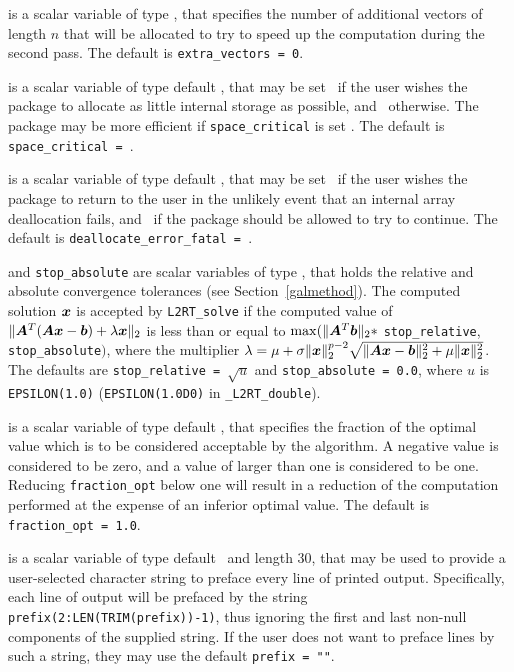 \documentclass{galahad}
\newcommand{\packagename}{L2\-RT}
\newcommand{\fullpackagename}{\libraryname\_\packagename}
\begin{document}
\begin{description}
 is a scalar variable of type \integer,
that specifies the number of additional vectors of length $n$
that will be allocated to try to speed up the computation during the
second pass.
The default is {\tt extra\_vectors = 0}.

 is a scalar variable of type default \logical, that
may be set \true\ if the user wishes the package to allocate as little
internal storage as possible, and \false\ otherwise. The package may
be more efficient if {\tt space\_critical} is set \false.
The default is {\tt space\_critical = \false}.

 is a scalar variable of type default \logical,
that may be set \true\ if the user wishes the package to return to the user
in the unlikely event that an internal array deallocation fails,
and \false\ if the package should be allowed to try to continue.
The default is {\tt deallocate\_error\_fatal = \false}.

 and {\tt stop\_absolute} are scalar variables of type
\realdp, that holds the
relative and absolute convergence tolerances (see Section~\ref{galmethod}).
The computed solution ${\bm{x}}$ is accepted by {\tt \packagename\_solve}
if the computed value of
$\|{\bm{A}}^T ( {\bm{A}} {\bm{x}} - {\bm{b}} ) + \lambda {\bm{x}}\|_2$
is less than or equal
to $\max (\| {\bm{A}}^T {\bm{b}} \|_2 \ast$ {\tt stop\_relative},
{\tt stop\_absolute}$)$, where the multiplier
$\lambda = \mu + \sigma \|{\bm{x}}\|_2^{p-2}
 \sqrt{\| {\bm{A}} {\bm{x}} - {\bm{b}} \|_2^2 + \mu \|{\bm{x}}\|_2^2}$.
The defaults are {\tt stop\_\-relative = $\sqrt{u}$} and
{\tt stop\_absolute = 0.0},
where $u$ is {\tt EPSILON(1.0)} ({\tt EPSILON(1.0D0)} in
{\tt \fullpackagename\_double}).

 is a scalar variable of type default
\realdp, that specifies the fraction
of the optimal value which is to be considered acceptable by the algorithm.
A negative value is considered to be zero, and a value of larger than one
is considered to be one. Reducing {\tt fraction\_opt} below one will result
in a reduction of the computation performed at the expense of an inferior
optimal value.
The default is {\tt fraction\_opt = 1.0}.

 is a scalar variable of type default \character\
and length 30, that may be used to provide a user-selected
character string to preface every line of printed output.
Specifically, each line of output will be prefaced by the string
{\tt prefix(2:LEN(TRIM(prefix))-1)},
thus ignoring the first and last non-null components of the
supplied string. If the user does not want to preface lines by such
a string, they may use the default {\tt prefix = ""}.

\end{description}
\end{document}
